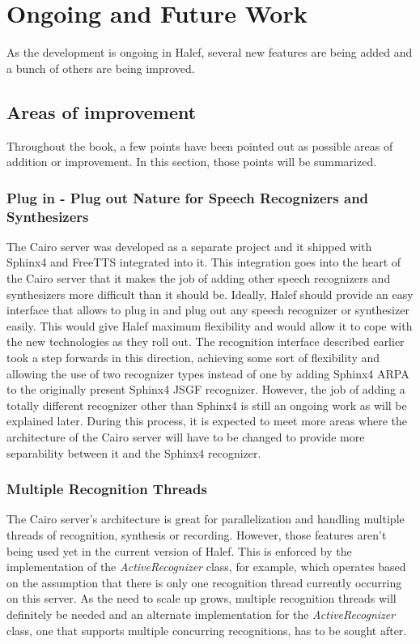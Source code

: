 \chapter{Ongoing and Future Work}
\label{chap:todo}
As the development is ongoing in Halef, several new features are being added and a bunch of others are being improved.

\section{Areas of improvement}
Throughout the book, a few points have been pointed out as possible areas of addition or improvement.
In this section, those points will be summarized.

\subsection{Plug in - Plug out Nature for Speech Recognizers and Synthesizers}
\label{subsec:pluginout}
The Cairo server was developed as a separate project and it shipped with Sphinx4 and FreeTTS integrated into it.
This integration goes into the heart of the Cairo server that it makes the job of adding other speech recognizers and synthesizers more difficult than it should be.
Ideally, Halef should provide an easy interface that allows to plug in and plug out any speech recognizer or synthesizer easily.
This would give Halef maximum flexibility and would allow it to cope with the new technologies as they roll out.
The recognition interface described earlier took a step forwards in this direction, achieving some sort of flexibility and allowing the use of two recognizer types instead of one by adding Sphinx4 ARPA to the originally present Sphinx4 JSGF recognizer.
However, the job of adding a totally different recognizer other than Sphinx4 is still an ongoing work as will be explained later.
During this process, it is expected to meet more areas where the architecture of the Cairo server will have to be changed to provide more separability between it and the Sphinx4 recognizer.

\subsection{Multiple Recognition Threads}
The Cairo server's architecture is great for parallelization and handling multiple threads of recognition, synthesis or recording.
However, those features aren't being used yet in the current version of Halef.
This is enforced by the implementation of the \textit{ActiveRecognizer} class, for example, which operates based on the assumption that there is only one recognition thread currently occurring on this server.
As the need to scale up grows, multiple recognition threads will definitely be needed and an alternate implementation for the \textit{ActiveRecognizer} class, one that supports multiple concurring recognitions, has to be sought after.

